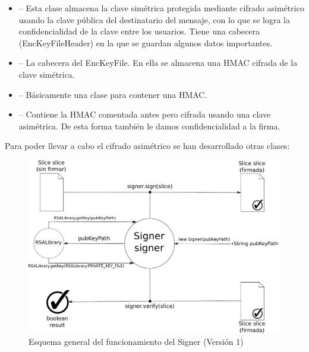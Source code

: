 \begin{itemize}
  \item {} -- Esta clase almacena la clave simétrica protegida
  mediante cifrado asimétrico usando la clave pública del destinatario del
  mensaje, con lo que se logra la confidencialidad de la clave entre los
  usuarios. Tiene una cabecera (EncKeyFileHeader) en la que se guardan algunos
  datos importantes.

  \item {} -- La cabecera del EncKeyFile. En ella se
  almacena una HMAC cifrada de la clave simétrica.

  \item {} -- Básicamente una clase para contener una HMAC.

  \item {} -- Contiene la HMAC comentada antes pero
  cifrada usando una clave asimétrica. De esta forma también le damos
  confidencialidad a la firma.
\end{itemize}

Para poder llevar a cabo el cifrado asimétrico se han desarrollado otras clases:

\begin{figure}[ht]
  \centering
  \includegraphics[scale=0.5]{Figures/Signer_1}
  \decoRule
  \caption[Signer (Versión 1)]{Esquema general del funcionamiento del Signer (Versión 1)}
  \label{fig:Signer_1}
\end{figure}

